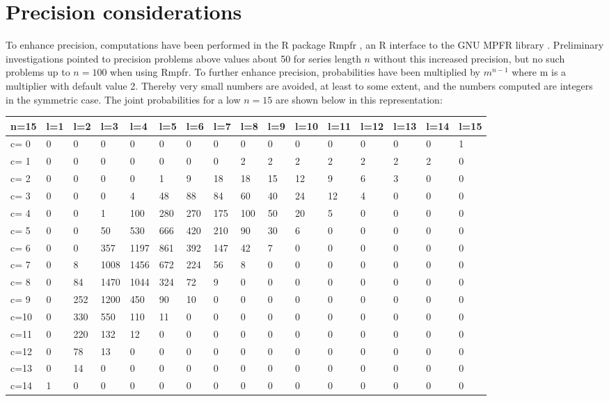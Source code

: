 \section{Precision considerations}

To enhance precision, computations have been performed in the R package Rmpfr \citep{Rmpfr}, an R interface to the GNU MPFR library \citep{FouLHLPZ-2007}. Preliminary investigations pointed to precision problems above values about 50 for series length $n$ without this increased precision, but no such problems up to $n=100$ when using Rmpfr. To further enhance precision, probabilities have been multiplied by $m^{n-1}$ where m is a multiplier with default value 2. Thereby very small numbers are avoided, at least to some extent, and the numbers computed are integers in the symmetric case. The joint probabilities for a low $n=15$ are shown below in this representation:

\tiny{
\begin{tabular}{l | l l l l l l l l l l l l l l l}
\hline
n=15&l=1&l=2&l=3&l=4&l=5&l=6&l=7&l=8&l=9&l=10&l=11&l=12&l=13&l=14&l=15\\
\hline
c= 0& 0& 0& 0& 0& 0& 0& 0& 0& 0& 0& 0& 0& 0& 0& 1\\
c= 1& 0& 0& 0& 0& 0& 0& 0& 2& 2& 2& 2& 2& 2& 2& 0\\
c= 2& 0& 0& 0& 0& 1& 9& 18& 18& 15& 12& 9& 6& 3& 0& 0\\
c= 3& 0& 0& 0& 4& 48& 88& 84& 60& 40& 24& 12& 4& 0& 0& 0\\
c= 4& 0& 0& 1& 100& 280& 270& 175& 100& 50& 20& 5& 0& 0& 0& 0\\
c= 5& 0& 0& 50& 530& 666& 420& 210& 90& 30& 6& 0& 0& 0& 0& 0\\
c= 6& 0& 0& 357& 1197& 861& 392& 147& 42& 7& 0& 0& 0& 0& 0& 0\\
c= 7& 0& 8& 1008& 1456& 672& 224& 56& 8& 0& 0& 0& 0& 0& 0& 0\\
c= 8& 0& 84& 1470& 1044& 324& 72& 9& 0& 0& 0& 0& 0& 0& 0& 0\\
c= 9& 0& 252& 1200& 450& 90& 10& 0& 0& 0& 0& 0& 0& 0& 0& 0\\
c=10& 0& 330& 550& 110& 11& 0& 0& 0& 0& 0& 0& 0& 0& 0& 0\\
c=11& 0& 220& 132& 12& 0& 0& 0& 0& 0& 0& 0& 0& 0& 0& 0\\
c=12& 0& 78& 13& 0& 0& 0& 0& 0& 0& 0& 0& 0& 0& 0& 0\\
c=13& 0& 14& 0& 0& 0& 0& 0& 0& 0& 0& 0& 0& 0& 0& 0\\
c=14& 1& 0& 0& 0& 0& 0& 0& 0& 0& 0& 0& 0& 0& 0& 0\\
\hline
\end{tabular}
}

